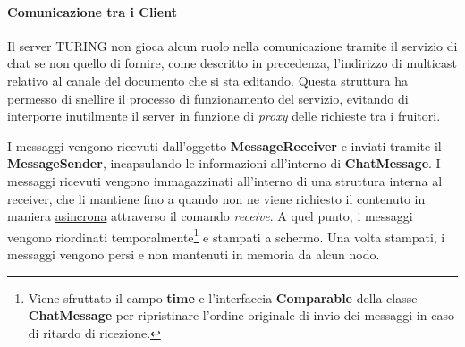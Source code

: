 \paragraph{Comunicazione tra i Client}
Il server TURING non gioca alcun ruolo nella comunicazione tramite il servizio di chat se non quello di fornire, come descritto in precedenza, l'indirizzo di multicast relativo al canale del documento che si sta editando. Questa struttura ha permesso di snellire il processo di funzionamento del servizio, evitando di interporre inutilmente il server in funzione di \textit{proxy} delle richieste tra i fruitori.

I messaggi vengono ricevuti dall'oggetto \textbf{MessageReceiver} e inviati tramite il \textbf{MessageSender}, incapsulando le informazioni all'interno di \textbf{ChatMessage}. I messaggi ricevuti vengono immagazzinati all'interno di una struttura interna al receiver, che li mantiene fino a quando non ne viene richiesto il contenuto in maniera \underline{asincrona} attraverso il comando \textit{receive}. A quel punto, i messaggi vengono riordinati temporalmente\footnote{Viene sfruttato il campo \textbf{time} e l'interfaccia \textbf{Comparable} della classe \textbf{ChatMessage} per ripristinare l'ordine originale di invio dei messaggi in caso di ritardo di ricezione.} e stampati a schermo. Una volta stampati, i messaggi vengono persi e non mantenuti in memoria da alcun nodo.